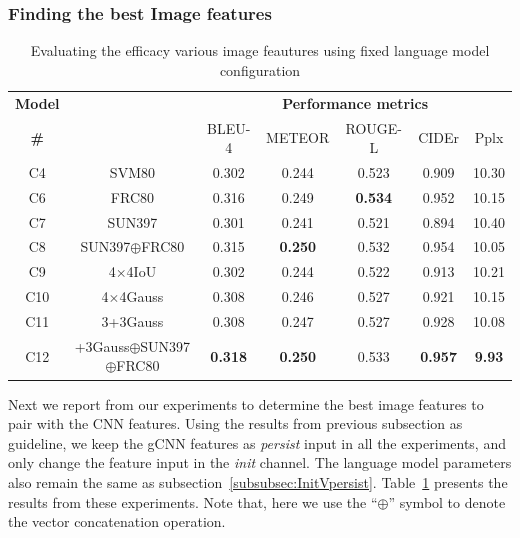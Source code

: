 \subsubsection{Finding the best Image features}
\begin{table}[htp]
  \centering
  \newcommand{\bs}{\small}
  \begin{adjustbox}{center}
  \begin{tabular}{|c|c|c|c|c|c|c|}
    \hline
    \bf Model & \bf \multirow{2}{*}{Init feature} & \multicolumn{5}{c|}{\bf Performance metrics}\\
    \cline{3-7}
    \bf \# &\bf &\bs BLEU-4 &\bs METEOR &\bs ROUGE-L &\bs CIDEr&\bs Pplx \\\hline
    C4 & SVM80               & 0.302 & 0.244 & 0.523 & 0.909 & 10.30  \\
    C6 & FRC80               & 0.316 & 0.249 &\bf0.534 & 0.952 & 10.15  \\
    C7 & SUN397              & 0.301 & 0.241 & 0.521 & 0.894 & 10.40  \\
    C8 & SUN397$\oplus$FRC80 & 0.315 &\bf0.250 & 0.532 &0.954 &10.05  \\\hline
    C9 & 4$\times$4IoU       & 0.302 & 0.244 & 0.522 & 0.913 & 10.21  \\
    C10 & 4$\times$4Gauss    & 0.308 & 0.246 & 0.527 & 0.921 & 10.15  \\
    C11 & 3+3Gauss           & 0.308 & 0.247 & 0.527 & 0.928 & 10.08  \\\hline
    C12 &\parbox[c][][c]{4cm}{\smallskip{}+3Gauss$\oplus$SUN397\\$\oplus$FRC80\smallskip} 
                             &\bf0.318&\bf0.250&0.533 &\bf0.957&\bf9.93\\\hline
  \end{tabular}
  \end{adjustbox}
  \caption{ Evaluating the efficacy various image feautures using fixed language model
          configuration}
  \label{tab:resCocFeatExpt}
\end{table}

Next we report from our experiments to determine the best image features to pair
with the CNN features.
Using the results from previous subsection as guideline, we keep the gCNN
features as \emph{persist} input in all the experiments, and only change the
feature input in the \emph{init} channel.
The language model parameters also remain the same as
subsection~\ref{subsubsec:InitVpersist}.
Table~\ref{tab:resCocFeatExpt} presents the results from these experiments.
Note that, here we use the ``$\oplus$'' symbol to denote the vector
concatenation operation.

